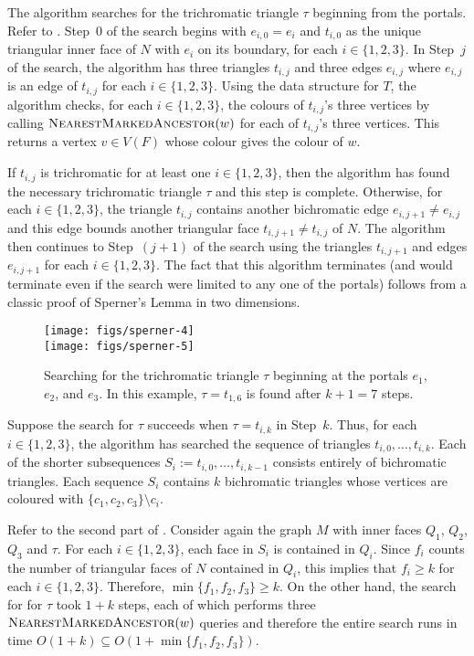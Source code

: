 \documentclass[kpfonts]{patmorin}
\let\ge\geqslant
\begin{document}
The algorithm searches for the trichromatic triangle $\tau$ beginning from the portals.  Refer to . Step~0 of the search begins with $e_{i,0}=e_i$ and $t_{i,0}$ as the unique triangular inner face of $N$ with $e_i$ on its boundary, for each $i\in\{1,2,3\}$. In Step~$j$ of the search, the algorithm has three triangles $t_{i,j}$ and three edges $e_{i,j}$ where $e_{i,j}$ is an edge of $t_{i,j}$ for each $i\in\{1,2,3\}$.  Using the data structure for $T$, the algorithm checks, for each $i\in\{1,2,3\}$, the colours of $t_{i,j}$'s three vertices by calling $\textsc{NearestMarkedAncestor}(w)$ for each of $t_{i,j}$'s three vertices.  This returns a vertex $v\in V(F)$ whose colour gives the colour of $w$.

If $t_{i,j}$ is trichromatic for at least one $i\in\{1,2,3\}$, then the algorithm has found the necessary trichromatic triangle $\tau$ and this step is complete. Otherwise, for each $i\in\{1,2,3\}$, the triangle $t_{i,j}$ contains another bichromatic edge $e_{i,j+1}\neq e_{i,j}$ and this edge bounds another triangular face $t_{i,j+1}\neq t_{i,j}$ of $N$.  The algorithm then continues to Step~$(j+1)$ of the search using the triangles $t_{i,j+1}$ and edges $e_{i,j+1}$ for each $i\in\{1,2,3\}$.  The fact that this algorithm terminates (and would terminate even if the search were limited to any one of the portals) follows from a classic proof of Sperner's Lemma in two dimensions.

 \begin{figure}
   \begin{center}
     \texttt{[image: figs/sperner-4]} \\[1ex]
     \texttt{[image: figs/sperner-5]}
   \end{center}
   \caption{Searching for the trichromatic triangle $\tau$ beginning at the portals $e_1$, $e_2$, and $e_3$. In this example, $\tau=t_{1,6}$ is found after $k+1=7$ steps.}
 \end{figure}

Suppose the search for $\tau$ succeeds when $\tau=t_{i,k}$ in Step~$k$.  Thus, for each $i\in\{1,2,3\}$, the algorithm has searched the sequence of triangles $t_{i,0},\ldots,t_{i,k}$.  Each of the shorter subsequences $S_i:=t_{i,0},\ldots,t_{i,k-1}$ consists entirely of bichromatic triangles. Each sequence $S_i$ contains $k$ bichromatic triangles whose vertices are coloured with $\{c_1,c_2,c_3\}\setminus c_i$.

Refer to the second part of . Consider again the graph $M$ with inner faces $Q_1$, $Q_2$, $Q_3$ and $\tau$. For each $i\in\{1,2,3\}$, each face in $S_i$ is contained in $Q_i$.  Since $f_i$ counts the number of triangular faces of $N$ contained in $Q_i$, this implies that $f_i\ge k$ for each $i\in \{1,2,3\}$.  Therefore, $\min\{f_1,f_2,f_3\}\ge k$.  On the other hand, the search for for $\tau$ took $1+k$ steps, each of which performs three $\textsc{NearestMarkedAncestor}(w)$ queries and therefore the entire search runs in time $O(1+k) \subseteq O(1+\min\{f_1,f_2,f_3\})$.
\end{document}
